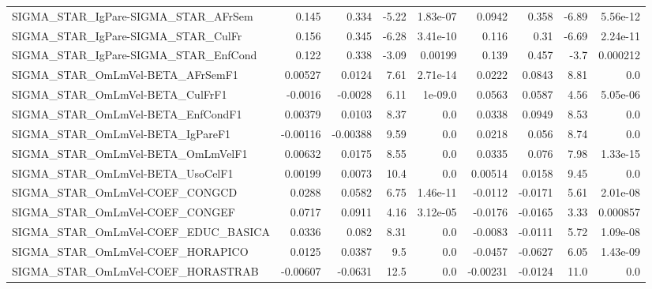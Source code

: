 \begin{tabular}{lrrrrrrrr}
SIGMA\_STAR\_IgPare-SIGMA\_STAR\_AFrSem   &       0.145 &        0.334 &   -5.22 & 1.83e-07 &     0.0942 &       0.358 &        -6.89 &      5.56e-12 \\
SIGMA\_STAR\_IgPare-SIGMA\_STAR\_CulFr    &       0.156 &        0.345 &   -6.28 & 3.41e-10 &      0.116 &        0.31 &        -6.69 &      2.24e-11 \\
SIGMA\_STAR\_IgPare-SIGMA\_STAR\_EnfCond  &       0.122 &        0.338 &   -3.09 &  0.00199 &      0.139 &       0.457 &         -3.7 &      0.000212 \\
SIGMA\_STAR\_OmLmVel-BETA\_AFrSemF1      &     0.00527 &       0.0124 &    7.61 & 2.71e-14 &     0.0222 &      0.0843 &         8.81 &           0.0 \\
SIGMA\_STAR\_OmLmVel-BETA\_CulFrF1       &     -0.0016 &      -0.0028 &    6.11 &  1e-09.0 &     0.0563 &      0.0587 &         4.56 &      5.05e-06 \\
SIGMA\_STAR\_OmLmVel-BETA\_EnfCondF1     &     0.00379 &       0.0103 &    8.37 &      0.0 &     0.0338 &      0.0949 &         8.53 &           0.0 \\
SIGMA\_STAR\_OmLmVel-BETA\_IgPareF1      &    -0.00116 &     -0.00388 &    9.59 &      0.0 &     0.0218 &       0.056 &         8.74 &           0.0 \\
SIGMA\_STAR\_OmLmVel-BETA\_OmLmVelF1     &     0.00632 &       0.0175 &    8.55 &      0.0 &     0.0335 &       0.076 &         7.98 &      1.33e-15 \\
SIGMA\_STAR\_OmLmVel-BETA\_UsoCelF1      &     0.00199 &       0.0073 &    10.4 &      0.0 &    0.00514 &      0.0158 &         9.45 &           0.0 \\
SIGMA\_STAR\_OmLmVel-COEF\_CONGCD        &      0.0288 &       0.0582 &    6.75 & 1.46e-11 &    -0.0112 &     -0.0171 &         5.61 &      2.01e-08 \\
SIGMA\_STAR\_OmLmVel-COEF\_CONGEF        &      0.0717 &       0.0911 &    4.16 & 3.12e-05 &    -0.0176 &     -0.0165 &         3.33 &      0.000857 \\
SIGMA\_STAR\_OmLmVel-COEF\_EDUC\_BASICA   &      0.0336 &        0.082 &    8.31 &      0.0 &    -0.0083 &     -0.0111 &         5.72 &      1.09e-08 \\
SIGMA\_STAR\_OmLmVel-COEF\_HORAPICO      &      0.0125 &       0.0387 &     9.5 &      0.0 &    -0.0457 &     -0.0627 &         6.05 &      1.43e-09 \\
SIGMA\_STAR\_OmLmVel-COEF\_HORASTRAB     &    -0.00607 &      -0.0631 &    12.5 &      0.0 &   -0.00231 &     -0.0124 &         11.0 &           0.0 \\

\end{tabular}
